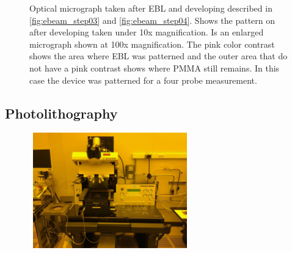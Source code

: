\begin{figure}[ht]
    \centering 
    \qquad
    \caption[Example of electron beam lithography patterning]{
        Optical micrograph taken after \acs{EBL} and developing described in \ref{fig:ebeam_step03} and \ref{fig:ebeam_step04}.
        \protect{} Shows the pattern on after developing taken under 10x magnification.
        \protect{} Is an enlarged micrograph shown at 100x magnification. The pink color contrast shows the area where \acs{EBL} was patterned and the outer area that do not have a 
        pink contrast shows where \acs{PMMA} still remains. In this case the device was patterned for a four probe measurement.
    }
\end{figure}

\subsection{Photolithography}\label{subsec:photo_lithography}

\begin{figure}[ht]
    \centering
    \includegraphics[height=5cm,width=7cm]{mask_aligner}
    \caption[Mask aligner for photolithography]{}
    \label{fig:mask_aligner}
\end{figure}

